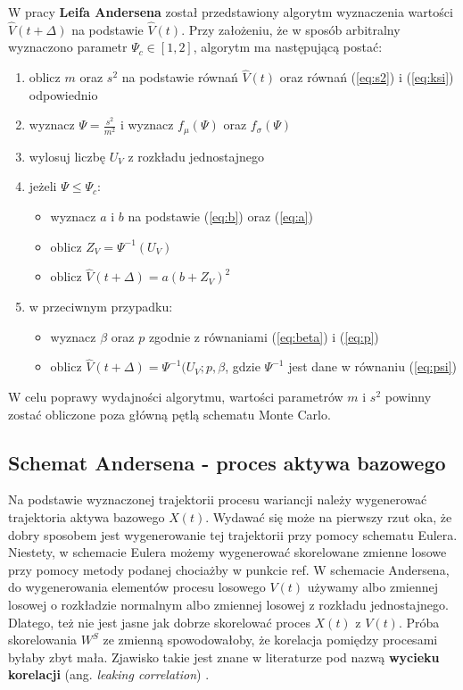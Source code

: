 \documentclass{pracamgr}
\begin{document}
{W pracy \textbf{Leifa Andersena} \cite{Andersen} został przedstawiony algorytm wyznaczenia 
wartości $\hat{V}(t + \Delta)$ na podstawie $\hat{V}(t)$. Przy założeniu, 
że w sposób arbitralny wyznaczono parametr $\Psi_c \in [1,2]$, algorytm 
ma następującą postać:

\begin{enumerate}
  \item oblicz $m$ oraz $s^2$ na podstawie równań $\hat{V}(t)$ oraz równań (\ref{eq:s2}) i (\ref{eq:ksi}) odpowiednio
  \item wyznacz $\Psi = \frac{s^2}{m^2}$ i wyznacz $f_{\mu}(\Psi)$ oraz $f_{\sigma}(\Psi)$ 
  \item wylosuj liczbę $U_V$ z rozkładu jednostajnego
  \item jeżeli $\Psi \leq \Psi_c$:
  \begin{itemize} 
  \item wyznacz $a$ i $b$ na podstawie (\ref{eq:b}) oraz (\ref{eq:a})
  \item oblicz $Z_V = \Psi^{-1}(U_V)$
  \item oblicz $\hat{V}(t + \Delta)  = a(b+ Z_V)^2$
  \end{itemize}
  \item w przeciwnym przypadku:
    \begin{itemize} 
  \item wyznacz $\beta$ oraz $p$ zgodnie z równaniami (\ref{eq:beta}) i (\ref{eq:p})
  \item oblicz $\hat{V}(t + \Delta)  =\Psi^{-1}(U_V;p,\beta$, gdzie $\Psi^{-1}$ jest dane w równaniu (\ref{eq:psi})
  \end{itemize}
  
\end{enumerate}


W celu poprawy wydajności algorytmu, wartości parametrów $m$ i $s^2$ powinny zostać obliczone poza główną pętlą schematu Monte Carlo.



\subsection{Schemat Andersena - proces aktywa bazowego}

Na podstawie wyznaczonej trajektorii procesu wariancji należy wygenerować trajektoria aktywa bazowego $X(t)$. Wydawać się może na pierwszy rzut oka, że dobry sposobem jest wygenerowanie tej trajektorii przy pomocy schematu Eulera. Niestety, w schemacie Eulera możemy wygenerować skorelowane zmienne losowe
przy pomocy metody podanej chociażby w punkcie ref.
W schemacie Andersena, do wygenerowania elementów procesu losowego $V(t)$ używamy albo zmiennej losowej o rozkładzie normalnym albo zmiennej losowej z rozkładu jednostajnego. Dlatego, też nie jest jasne jak dobrze skorelować proces $X(t)$ z $V(t)$. Próba skorelowania $W^S$ ze zmienną spowodowałoby, że korelacja pomiędzy procesami byłaby zbyt mała. Zjawisko takie jest znane w literaturze pod nazwą \textbf{wycieku korelacji} (ang. \textit{leaking correlation}) \cite{Andersen}. 

}
\end{document}
